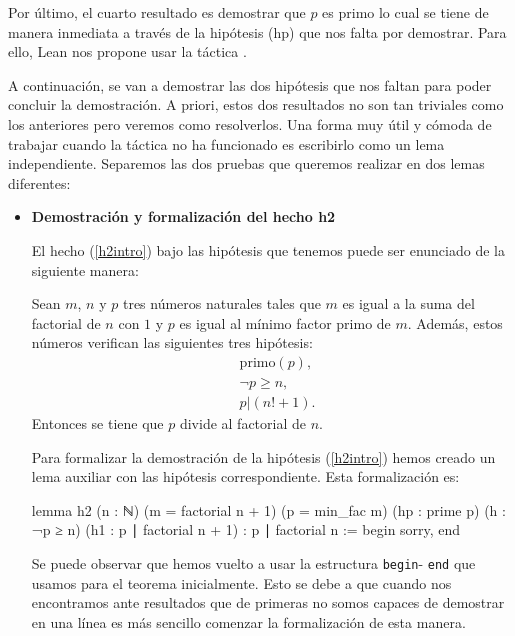 Por último, el cuarto resultado es demostrar que \(p\) es primo lo cual
se tiene de manera inmediata a través de la hipótesis (hp) que nos falta
por demostrar.  Para ello, Lean nos propone usar la táctica
.

A continuación, se van a demostrar las dos hipótesis que nos faltan para
poder concluir la demostración. A priori, estos dos resultados no son
tan triviales como los anteriores pero veremos como resolverlos. Una
forma muy útil y cómoda de trabajar cuando la táctica
 no ha funcionado es escribirlo
como un lema independiente. Separemos las dos pruebas que queremos
realizar en dos lemas diferentes:
\begin{itemize}
\item \textbf{Demostración y formalización del hecho h2}

  El hecho (\ref{h2intro}) bajo las hipótesis que tenemos puede ser
  enunciado de la siguiente manera:
  \begin{lema}[h2]
    Sean \(m\), \(n\) y \(p\) tres números naturales tales que \(m\) es
    igual a la suma del factorial de \(n\) con \(1\) y \(p\) es igual al
    mínimo factor primo de \(m\). Además, estos números verifican las
    siguientes tres hipótesis:
    \begin{align}
      &\text{primo}(p),\label{hpintro}\tag{hp}\\
      &¬p ≥ n,         \tag{h}\label{hintro}\\
      &p | (n!+1).       \tag{h1}\label{h11intro}
    \end{align}
    Entonces se tiene que \(p\) divide al factorial de \(n\).
  \end{lema}

  Para formalizar la demostración de la hipótesis (\ref{h2intro}) hemos creado
  un lema auxiliar con las hipótesis correspondiente. Esta formalización es:
  \begin{leancode}
lemma h2
  (n : ℕ)
  (m = factorial n + 1)
  (p = min_fac m)
  (hp : prime p)
  (h : ¬p ≥ n)
  (h1 : p ∣ factorial n + 1)
  : p ∣ factorial n :=
  begin
    sorry,
end
  \end{leancode}

  Se puede observar que hemos vuelto a usar la estructura \texttt{begin}-
  \texttt{end} que usamos para el teorema inicialmente. Esto se debe a que
  cuando nos encontramos ante resultados que de primeras no somos capaces de
  demostrar en una línea es más sencillo comenzar la formalización de esta
  manera.


\end{itemize}
